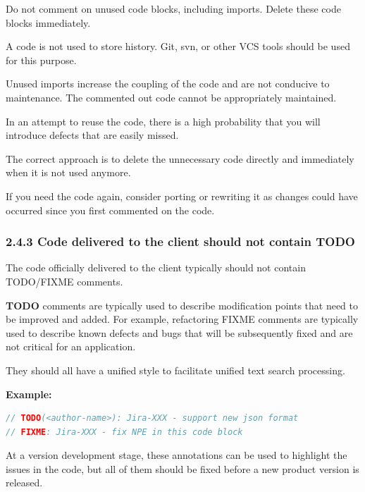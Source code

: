 Do not comment on unused code blocks, including imports. Delete these code blocks immediately.

A code is not used to store history. Git, svn, or other VCS tools should be used for this purpose.

Unused imports increase the coupling of the code and are not conducive to maintenance. The commented out code cannot be appropriately maintained.

In an attempt to reuse the code, there is a high probability that you will introduce defects that are easily missed.

The correct approach is to delete the unnecessary code directly and immediately when it is not used anymore.

If you need the code again, consider porting or rewriting it as changes could have occurred since you first commented on the code. 



\subsubsection*{\textbf{2.4.3 Code delivered to the client should not contain TODO}}
\leavevmode\newline

\label{sec:2.4.3}



The code officially delivered to the client typically should not contain TODO/FIXME comments.

\textbf{TODO} comments are typically used to describe modification points that need to be improved and added. For example, refactoring FIXME comments are typically used to describe known defects and bugs that will be subsequently fixed and are not critical for an application.

They should all have a unified style to facilitate unified text search processing.



\textbf{Example:}



\begin{lstlisting}[language=Kotlin]
// TODO(<author-name>): Jira-XXX - support new json format
// FIXME: Jira-XXX - fix NPE in this code block
\end{lstlisting}


At a version development stage, these annotations can be used to highlight the issues in the code, but all of them should be fixed before a new product version is released.

